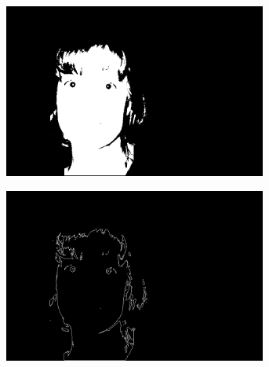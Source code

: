 \begin{figure}[H]
\begin{subfigure}{.24\textwidth}
  \caption{}
\end{subfigure}
\begin{subfigure}{.24\textwidth}
  \centering
  \includegraphics[width=0.95\textwidth]{img/fd/ThresholdGrayFace.png}
  \caption{}
\end{subfigure}
\begin{subfigure}{.24\textwidth}
  \centering
  \includegraphics[width=0.95\textwidth]{img/fd/FilteredFaceMask.png}
  \caption{}
\end{subfigure}

\end{figure}
